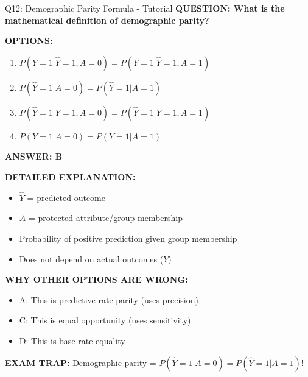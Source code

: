 \documentclass[8pt]{beamer}
\begin{document}
	\begin{frame}{Q12: Demographic Parity Formula - Tutorial}
		\fontsize{6.5}{7.5}\selectfont
		\textbf{QUESTION: What is the mathematical definition of demographic parity?}
		
		\vspace{0.1cm}
		\textbf{OPTIONS:}
		\begin{enumerate}
			\item $P(Y=1|\hat{Y}=1,A=0) = P(Y=1|\hat{Y}=1,A=1)$
			\item $P(\hat{Y}=1|A=0) = P(\hat{Y}=1|A=1)$
			\item $P(\hat{Y}=1|Y=1,A=0) = P(\hat{Y}=1|Y=1,A=1)$
			\item $P(Y=1|A=0) = P(Y=1|A=1)$
		\end{enumerate}
		
		\vspace{0.1cm}
		\textcolor{myblue}{\textbf{ANSWER: B}}
		
		\vspace{0.1cm}
		\textbf{DETAILED EXPLANATION:}
		\begin{itemize}
			\item $\hat{Y}$ = predicted outcome
			\item $A$ = protected attribute/group membership
			\item Probability of positive prediction given group membership
			\item Does not depend on actual outcomes ($Y$)
		\end{itemize}
		
		\vspace{0.1cm}
		\textcolor{myred}{\textbf{WHY OTHER OPTIONS ARE WRONG:}}
		\begin{itemize}
			\item \textcolor{myred}{A:} This is predictive rate parity (uses precision)
			\item \textcolor{myred}{C:} This is equal opportunity (uses sensitivity)
			\item \textcolor{myred}{D:} This is base rate equality
		\end{itemize}
		
		\textcolor{myred}{\textbf{EXAM TRAP:}} Demographic parity = \textcolor{myblue}{$P(\hat{Y}=1|A=0) = P(\hat{Y}=1|A=1)$}!
	\end{frame}
	
\end{document}
